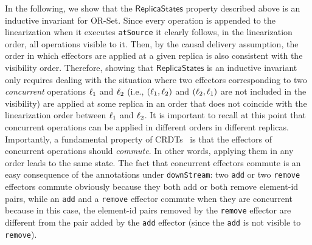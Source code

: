 In the following, we show that the $\mathsf{ReplicaStates}$ property described above is an inductive invariant for OR-Set. Since every operation is appended to the linearization when it executes \lstinline|atSource| it clearly follows, in the linearization order, all operations visible to it. Then, by the causal delivery assumption, the order in which effectors are applied at a given replica is also consistent with the visibility order. 
Therefore, showing that $\mathsf{ReplicaStates}$ is an inductive
invariant only requires dealing with the situation where two effectors
corresponding to two \emph{concurrent} operations $\ell_1$ and
$\ell_2$ (i.e., $(\ell_1,\ell_2)$ and $(\ell_2,\ell_1)$
are not included in the visibility) are applied at some replica in an
order that does not coincide with the linearization order between $\ell_1$ and $\ell_2$. 
It is important to recall at this point that concurrent operations can be applied in different orders in different replicas. 
Importantly, a fundamental property of CRDTs~\cite{ShapiroPBZ11} is that the effectors of concurrent operations should \emph{commute}. In other words, applying them in any order leads to the same state.
The fact that concurrent effectors commute is an easy consequence of the annotations under \lstinline|downStream|: two {\tt add} or two {\tt remove} effectors commute obviously because they both add or both remove element-id pairs, while an {\tt add} and a {\tt remove} effector commute when they are concurrent because in this case, the element-id pairs removed by the {\tt remove} effector are different from the pair added by the {\tt add} effector (since the {\tt add} is not visible to {\tt remove}).

